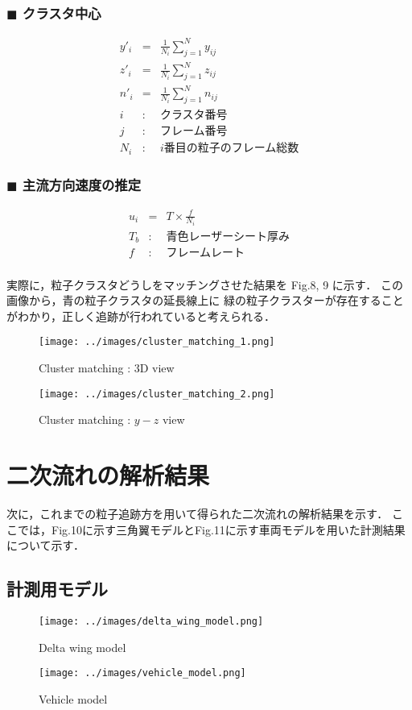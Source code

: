 \documentclass[twocolumn,a4j]{jsarticle}
\begin{document}
\subsubsection*{$\blacksquare$ クラスタ中心}
\begin{eqnarray*}
	y'_i &=& \frac{1}{N_i} \sum_{j=1}^{N} y_{ij} \\
	z'_i &=& \frac{1}{N_i} \sum_{j=1}^{N} z_{ij} \\
	n'_i &=& \frac{1}{N_i} \sum_{j=1}^{N} n_{ij} \\
	i &:& \text{クラスタ番号}\\
	j &:& \text{フレーム番号}\\
	N_i &:& i \text{番目の粒子のフレーム総数}
\end{eqnarray*}

\subsubsection*{$\blacksquare$ 主流方向速度の推定}
\begin{eqnarray*}
	u_i &=& T \times \frac{f}{N_i}\\
	T_b &:& \text{青色レーザーシート厚み} \\
	f &:& \text{フレームレート}\\
\end{eqnarray*}

\newpage
実際に，粒子クラスタどうしをマッチングさせた結果を Fig.8, 9 に示す．
この画像から，青の粒子クラスタの延長線上に
緑の粒子クラスターが存在することがわかり，正しく追跡が行われていると考えられる．

\begin{figure}[htbp]
	\centering
	\texttt{[image: ../images/cluster\_matching\_1.png]}
	\caption{Cluster matching : 3D view}
	\texttt{[image: ../images/cluster\_matching\_2.png]}
	\caption{Cluster matching : $y-z$ view}
\end{figure}

\section{二次流れの解析結果}
次に，これまでの粒子追跡方を用いて得られた二次流れの解析結果を示す．
ここでは，Fig.10に示す三角翼モデルとFig.11に示す車両モデルを用いた計測結果について示す．\\

\subsection{計測用モデル}
\begin{figure}[htbp]
	\centering
	\texttt{[image: ../images/delta\_wing\_model.png]}
	\caption{Delta wing model}
	\texttt{[image: ../images/vehicle\_model.png]}
	\caption{Vehicle model}
\end{figure}
\end{document}
